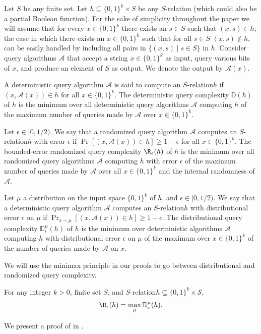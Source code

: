 \documentclass{toc}
\newcommand{\relation}{$S$-relation\xspace}     %
\newcommand{\arelation}{an $S$-relation\xspace} %
\newcommand{\D}{\mathbb{D}}
\newcommand{\cA}{\mathcal{A}}
\begin{document}
Let $S$ be any
%
finite set. Let $h \subseteq \{0,1\}^k \times S$ be any \relation 
%
(which could also be a partial Boolean function). For the sake of simplicity throughout the paper we will assume that for every $x \in \{0,1\}^k$ there exists an $s \in S$ such that $(x,s) \in h$; the case in which there exists an $x \in \{0,1\}^k$ such that for all $s \in S$ $(x,s) \notin h$, can be easily handled by including all pairs in $\{(x, s) \mid s \in S\}$ in $h$. Consider query algorithms $\mathcal A$ that accept a string $x \in\{0,1\}^k$ as input, query various bits of $x$, and produce an element of $S$ as output. We denote the output by $\mathcal{A}(x)$.
\begin{definition}
A deterministic query algorithm $\cA$ is said to compute
%
\arelation $h$ if $(x, \cA(x)) \in h$ for all $x \in \{0,1\}^k$.
The deterministic query complexity $\D(h)$ of $h$ is the minimum over all deterministic query algorithms $\cA$ computing $h$ of the maximum number of queries made by $\cA$ over $x \in \{0,1\}^k$.  
\end{definition}

\begin{definition}
Let $\epsilon \in [0,1/2)$.  We say that a randomized query algorithm $\cA$ computes
%
\arelation $h$ with error $\epsilon$ if $\Pr[(x,\cA(x)) \in h] \geq 1 - \epsilon$ for all $x \in \{0,1\}^k$.
The bounded-error randomized query complexity $\R_\epsilon(h)$ of $h$ is the minimum over all randomized query algorithms $\cA$ computing $h$ with error $\epsilon$ of the 
maximum number of queries made by $\cA$ over all $x \in \{0,1\}^k$ and the internal randomness of $\cA$.
\end{definition}

\begin{definition}
 Let $\mu$ a distribution on the input space $\{0,1\}^k$ of $h$, and $\epsilon \in [0,1/2)$.  We say that a deterministic query algorithm $\cA$ computes
\arelation $h$ with distributional error $\epsilon$ on $\mu$ if 
 $\Pr_{x \sim \mu}[(x,\mathcal A(x)) \in h] \geq 1 - \epsilon$.
 The distributional query complexity $\D^\mu_\epsilon(h)$ of $h$ is the minimum over deterministic algorithms $\cA$ computing $h$ with distributional error $\epsilon$ on $\mu$ of the maximum over $x \in \{0,1\}^k$ 
 of the number of queries made by $\cA$ on $x$.
 \end{definition}

We will use the minimax principle in our proofs to go between distributional and randomized query complexity.
\begin{fact}
\label{minmax}
For any integer $k >0$, %
finite set $S$, and \relation $h \subseteq \{0,1\}^k \times \mathcal{S}$,
\[\R_\epsilon(h)=\max_{\mu}\D_\epsilon^\mu(h).\]
\end{fact}
We present a proof of  in .
\end{document}
